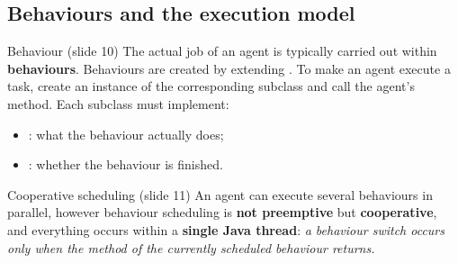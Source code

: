 \subsection{Behaviours and the execution model}
\label{sec:jade-behaviours}

\begin{nbdef}{Behaviour (slide 10)}
The actual job of an agent is typically carried out within \textbf{behaviours}. Behaviours
are created by extending . To make an agent execute a
task, create an instance of the corresponding subclass and call the agent's
 method. Each subclass must implement:
\begin{itemize}[nosep]
  \item {}: what the behaviour actually does;
  \item {}: whether the behaviour is finished.
\end{itemize}
\end{nbdef}

\begin{nbfact}{Cooperative scheduling (slide 11)}
An agent can execute several behaviours in parallel, however behaviour scheduling is
\textbf{not preemptive} but \textbf{cooperative}, and everything occurs within a
\textbf{single Java thread}: \emph{a behaviour switch occurs only when the 
method of the currently scheduled behaviour returns.}
\end{nbfact}

